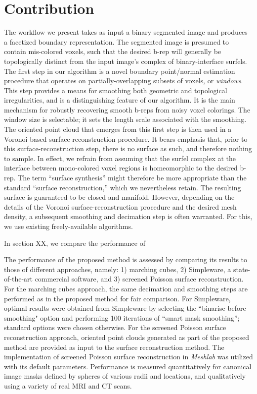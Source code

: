 \section{Contribution}

The workflow we present takes as input a binary segmented image and produces a facetized boundary representation.  The segmented image is presumed to contain mis-colored voxels, such that the desired b-rep will generally be topologically distinct from the input image's complex of binary-interface surfels.  The first step in our algorithm is a novel boundary point/normal estimation procedure that operates on partially-overlapping subsets of voxels, or {\em windows}.  This step provides a means for smoothing both geometric and topological irregularities, and is a distinguishing feature of our algorithm.  It is the main mechanism for robustly recovering smooth b-reps from noisy voxel colorings.  The window size is selectable; it sets the length scale associated with the smoothing.  The oriented point cloud that emerges from this first step is then used in a Voronoi-based surface-reconstruction procedure.  It bears emphasis that, prior to this surface-reconstruction step, there is no surface as such, and therefore nothing to sample.  In effect, we refrain from assuming that the surfel complex at the interface between mono-colored voxel regions is homeomorphic to the desired b-rep.  The term ``surface synthesis'' might therefore be more appropriate than the standard ``surface reconstruction,'' which we nevertheless retain. The resulting surface is guaranteed to be closed and manifold.  However, depending on the details of the Voronoi surface-reconstruction procedure and the desired mesh density, a subsequent smoothing and decimation step is often warranted.  For this, we use existing freely-available algorithms.

In section XX, we compare the performance of

The performance of the proposed method is assessed by comparing its results to those of different approaches, namely: 1) marching cubes, 2) Simpleware, a state-of-the-art commercial software, and 3) screened Poisson surface reconstruction. For the marching cubes approach, the same decimation and smoothing steps are performed as in the proposed method for fair comparison. For Simpleware, optimal results were obtained from {Simpleware} by selecting the ``binarise before smoothing" option and performing 100 iterations of ``smart mask smoothing''; standard options were chosen otherwise. For the screened Poisson surface reconstruction approach, oriented point clouds generated as part of the proposed method are provided as input to the surface reconstruction method. The implementation of screened Poisson surface reconstruction in \textit{Meshlab} was utilized with its default parameters.  Performance is measured quantitatively for canonical image masks defined by spheres of various radii and locations, and qualitatively using a variety of real MRI and CT scans.


